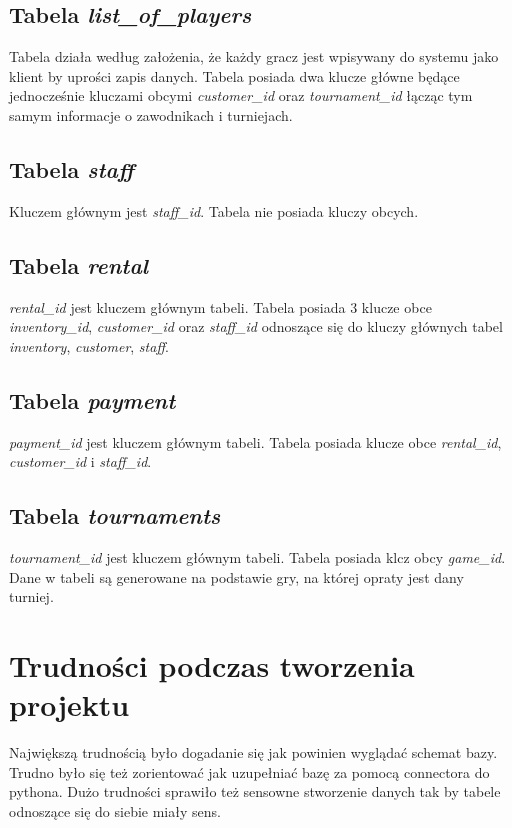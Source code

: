 \documentclass[12pt,a4paper]{article}
\begin{document}
\subsection{Tabela \textit{list\_of\_players}}
Tabela działa według założenia, że każdy gracz jest wpisywany do systemu jako klient by uprości zapis danych.
Tabela posiada dwa klucze główne będące jednocześnie kluczami obcymi \textit{customer\_id} oraz \textit{tournament\_id} łącząc tym samym informacje o zawodnikach i turniejach.

\subsection{Tabela \textit{staff}}
Kluczem głównym jest \textit{staff\_id}. Tabela nie posiada kluczy obcych.

\subsection{Tabela \textit{rental}}
\textit{rental\_id} jest kluczem głównym tabeli.
Tabela posiada 3 klucze obce \textit{inventory\_id}, \textit{customer\_id} oraz \textit{staff\_id} odnoszące się do kluczy głównych tabel \textit{inventory}, \textit{customer}, \textit{staff}.

\subsection{Tabela \textit{payment}}
\textit{payment\_id} jest kluczem głównym tabeli.
Tabela posiada klucze obce \textit{rental\_id}, \textit{customer\_id} i \textit{staff\_id}.

\subsection{Tabela \textit{tournaments}}
\textit{tournament\_id} jest kluczem głównym tabeli.
Tabela posiada klcz obcy \textit{game\_id}. Dane w tabeli są generowane na podstawie gry, na której opraty jest dany turniej.

\section{Trudności podczas tworzenia projektu}
Największą trudnością było dogadanie się jak powinien wyglądać schemat bazy. Trudno było się też zorientować jak
uzupełniać bazę za pomocą connectora do pythona. Dużo trudności sprawiło też sensowne stworzenie danych tak by tabele
odnoszące się do siebie miały sens.
\end{document}
